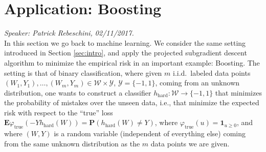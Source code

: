 
\chapter{Application: Boosting}

\emph{Speaker: Patrick Rebeschini, 02/11/2017.}\\

In this section we go back to machine learning. We consider the same setting introduced in Section \ref{sec:intro}, and apply the projected subgradient descent algorithm to minimize the empirical risk in an important example: Boosting. The setting is that of binary classification, where given $m$ i.i.d.\ labeled data points $(W_1,Y_1),\ldots,(W_m,Y_m)\in\mathcal{W}\times\mathcal{Y}$, $\mathcal{Y}=\{-1,1\}$, coming from an unknown distribution, one wants to construct a classifier $h_\text{hard}:\mathcal{W} \rightarrow \{-1,1\}$ that minimizes the probability of mistakes over the unseen data, i.e., that minimize the expected risk with respect to the ``true'' loss $\mathbf{E} \varphi_\text{true}(-Yh_\text{hard}(W))=\mathbf{P} (h_\text{hard}(W)\neq Y)$, where $\varphi_\text{true}(u) = \mathbf{1}_{u\ge 0}$, and where $(W,Y)$ is a random variable (independent of everything else) coming from the same unknown distribution as the $m$ data points we are given.

